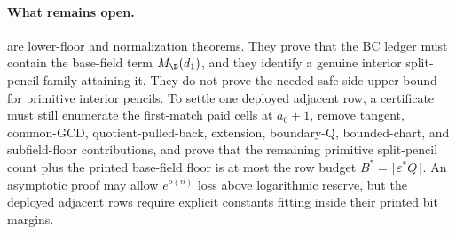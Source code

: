 \paragraph{What remains open.}
 are lower-floor
and normalization theorems.  They prove that the BC ledger must contain the
base-field term \(M_{\B}(d_1)\), and they identify a genuine interior
split-pencil family attaining it.  They do not prove the needed safe-side
upper bound for primitive interior pencils.  To settle one deployed adjacent
row, a certificate must still enumerate the first-match paid cells at
\(a_0+1\), remove tangent, common-GCD, quotient-pulled-back, extension,
boundary-Q, bounded-chart, and subfield-floor contributions, and prove that
the remaining primitive split-pencil count plus the printed base-field floor
is at most the row budget \(B^*=\lfloor\varepsilon^*Q\rfloor\).  An
asymptotic proof may allow \(e^{o(n)}\) loss above logarithmic reserve, but
the deployed adjacent rows require explicit constants fitting inside their
printed bit margins.
